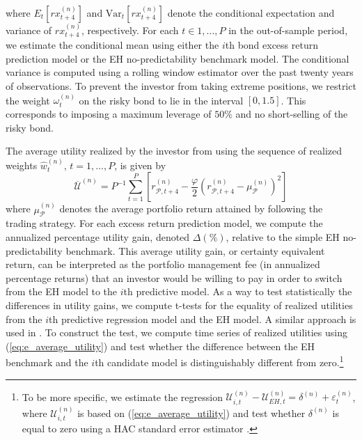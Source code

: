 \documentclass[12pt,letterpaper,leqno,doublespacing]{article}
\begin{document}
where $E_{t}\left[rx_{t+4}^{\left(n\right)}\right]$ and $\text{Var}_{t}\left[rx_{t+4}^{\left(n\right)}\right]$ denote the conditional expectation and variance of $rx_{t+4}^{\left(n\right)}$, respectively. For each $t \in 1,\ldots,P$ in the out-of-sample period, we estimate the conditional mean using either the $i$th bond excess return prediction model or the EH no-predictability benchmark model. The conditional variance is computed using a rolling window estimator over the past twenty years of observations. To prevent the investor from taking extreme positions, we restrict the weight $\omega_{t}^{\left(n\right)}$ on the risky bond to lie in the interval $\left[0,1.5\right]$. This corresponds to imposing a maximum leverage of $50\%$ and no short-selling of the risky bond.

The average utility realized by the investor from using the sequence of realized weights $\hat{w}_{t}^{\left(n\right)},\, t=1,\ldots,P$, is given by
\begin{equation}
    \overline{\mathcal{U}}^{\left(n\right)} = P^{-1} \sum_{t=1}^{P}\left[r_{\mathcal{P},t+4}^{\left(n\right)} - \frac{\varphi}{2}\left(r_{\mathcal{P},t+4}^{\left(n\right)}-\mu_{\mathcal{P}}^{\left(n\right)}\right)^{2}\right]
    \label{eq:e_average_utility}
\end{equation}
where $\mu_{\mathcal{P}}^{\left(n\right)}$ denotes the average portfolio return attained by following the trading strategy. For each excess return prediction model, we compute the annualized percentage utility gain, denoted $\Delta\left(\%\right)$, relative to the simple EH no-predictability benchmark. This average utility gain, or certainty equivalent return, can be interpreted as the portfolio management fee (in annualized percentage returns) that an investor would be willing to pay in order to switch from the EH model to the $i$th predictive model. As a way to test statistically the differences in utility gains, we compute \cite{DieboldMariano1995} t-tests for the equality of realized utilities from the $i$th predictive regression model and the EH model. A similar approach is used in \cite{GarganoPettenuzzoTimmermann2014}. To construct the test, we compute time series of realized utilities using (\ref{eq:e_average_utility}) and test whether the difference between the EH benchmark and the $i$th candidate model is distinguishably different from zero.\footnote{To be more specific, we estimate the regression $\mathcal{U}_{i,t}^{\left(n\right)}-\mathcal{U}_{EH,t}^{\left(n\right)} = \delta^{\left(n\right)} + \varepsilon_{t}^{\left(n\right)}$, where $\mathcal{U}_{i,t}^{\left(n\right)}$ is based on (\ref{eq:e_average_utility}) and test whether $\delta^{\left(n\right)}$ is equal to zero using a HAC standard error estimator \citep{GarganoPettenuzzoTimmermann2014}.}
\end{document}
